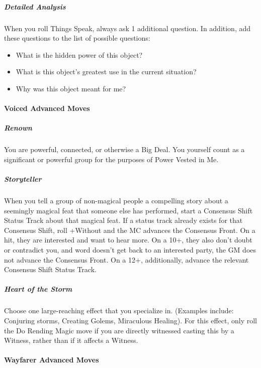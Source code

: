 \documentclass[
]{article}
\begin{document}
\hypertarget{detailed-analysis}{%
\subparagraph{Detailed Analysis}\label{detailed-analysis}}

When you roll Things Speak, always ask 1 additional question. In
addition, add these questions to the list of possible questions:

\begin{itemize}
\item
  What is the hidden power of this object?
\item
  What is this object's greatest use in the current situation?
\item
  Why was this object meant for me?
\end{itemize}

\hypertarget{voiced-advanced-moves}{%
\paragraph{Voiced Advanced Moves}\label{voiced-advanced-moves}}

\hypertarget{renown}{%
\subparagraph{Renown}\label{renown}}

You are powerful, connected, or otherwise a Big Deal. You yourself count
as a significant or powerful group for the purposes of Power Vested in
Me.

\hypertarget{storyteller}{%
\subparagraph{Storyteller}\label{storyteller}}

When you tell a group of non-magical people a compelling story about a
seemingly magical feat that someone else has performed, start a
Consensus Shift Status Track about that magical feat. If a status track
already exists for that Consensus Shift, roll +Without and the MC
advances the Consensus Front. On a hit, they are interested and want to
hear more. On a 10+, they also don't doubt or contradict you, and word
doesn't get back to an interested party, the GM does not advance the
Consensus Front. On a 12+, additionally, advance the relevant Consensus
Shift Status Track.

\hypertarget{heart-of-the-storm}{%
\subparagraph{Heart of the Storm}\label{heart-of-the-storm}}

Choose one large-reaching effect that you specialize in. (Examples
include: Conjuring storms, Creating Golems, Miraculous Healing). For
this effect, only roll the Do Rending Magic move if you are directly
witnessed casting this by a Witness, rather than if it affects a
Witness.

\hypertarget{wayfarer-advanced-moves}{%
\paragraph{Wayfarer Advanced Moves}\label{wayfarer-advanced-moves}}
\end{document}
